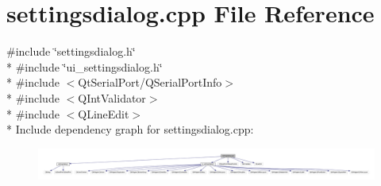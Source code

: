 \hypertarget{a00131}{\section{settingsdialog.\+cpp File Reference}
\label{a00131}
}
{\ttfamily \#include \char`\"{}settingsdialog.\+h\char`\"{}}\\*
{\ttfamily \#include \char`\"{}ui\+\_\+settingsdialog.\+h\char`\"{}}\\*
{\ttfamily \#include $<$Qt\+Serial\+Port/\+Q\+Serial\+Port\+Info$>$}\\*
{\ttfamily \#include $<$Q\+Int\+Validator$>$}\\*
{\ttfamily \#include $<$Q\+Line\+Edit$>$}\\*
Include dependency graph for settingsdialog.\+cpp\+:
\nopagebreak
\begin{figure}[H]
\begin{center}
\leavevmode
\includegraphics[width=350pt]{d0/dc5/a00343}
\end{center}
\end{figure}
